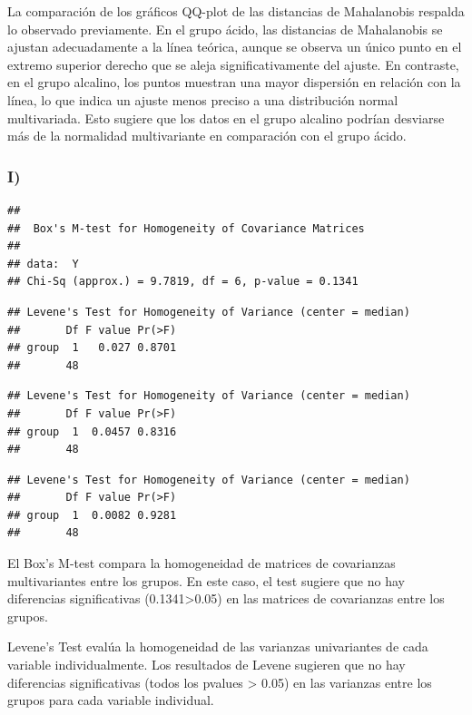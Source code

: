 \documentclass[
]{article}
\begin{document}
La comparación de los gráficos QQ-plot de las distancias de Mahalanobis
respalda lo observado previamente. En el grupo ácido, las distancias de
Mahalanobis se ajustan adecuadamente a la línea teórica, aunque se
observa un único punto en el extremo superior derecho que se aleja
significativamente del ajuste. En contraste, en el grupo alcalino, los
puntos muestran una mayor dispersión en relación con la línea, lo que
indica un ajuste menos preciso a una distribución normal multivariada.
Esto sugiere que los datos en el grupo alcalino podrían desviarse más de
la normalidad multivariante en comparación con el grupo ácido.

\hypertarget{i}{%
\subsubsection{I)}\label{i}}

\begin{verbatim}
## 
##  Box's M-test for Homogeneity of Covariance Matrices
## 
## data:  Y
## Chi-Sq (approx.) = 9.7819, df = 6, p-value = 0.1341
\end{verbatim}

\begin{verbatim}
## Levene's Test for Homogeneity of Variance (center = median)
##       Df F value Pr(>F)
## group  1   0.027 0.8701
##       48
\end{verbatim}

\begin{verbatim}
## Levene's Test for Homogeneity of Variance (center = median)
##       Df F value Pr(>F)
## group  1  0.0457 0.8316
##       48
\end{verbatim}

\begin{verbatim}
## Levene's Test for Homogeneity of Variance (center = median)
##       Df F value Pr(>F)
## group  1  0.0082 0.9281
##       48
\end{verbatim}

El Box's M-test compara la homogeneidad de matrices de covarianzas
multivariantes entre los grupos. En este caso, el test sugiere que no
hay diferencias significativas (0.1341\textgreater0.05) en las matrices
de covarianzas entre los grupos.

Levene's Test evalúa la homogeneidad de las varianzas univariantes de
cada variable individualmente. Los resultados de Levene sugieren que no
hay diferencias significativas (todos los pvalues \textgreater{} 0.05)
en las varianzas entre los grupos para cada variable individual.
\end{document}
